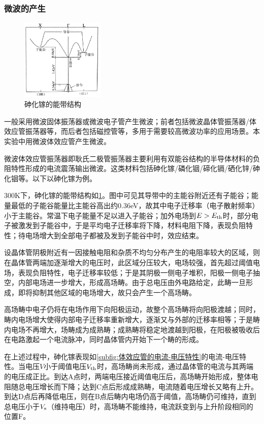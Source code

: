 	\subsubsection{微波的产生} %
	\label{ssub:微波的产生}
		\FloatBarrier
		\begin{figure}
			\includegraphics[width=4cm]{./fig/scan/EnergyBandStructureofGaAs.png}\caption{砷化镓的能带结构\label{fig:砷化镓的能带结构}}
		\end{figure}
		\FloatBarrier
		\par 一般采用微波固体振荡器或微波电子管产生微波；前者包括微波晶体管振荡器/体效应管振荡器等，而后者包括磁控管等，多用于需要较高微波功率的应用场景。本实验中用微波体效应管产生微波。
		\par 微波体效应管振荡器即耿氏二极管振荡器主要利用有双能谷结构的半导体材料的负阻特性形成的电流震荡输出微波。这类材料包括砷化镓/磷化铟/碲化镉/硒化锌/砷化铟等。以下以砷化镓为例。
		\par 300K下，砷化镓的能带结构如\cref{fig:砷化镓的能带结构}。图中可见其导带中的主能谷附近还有子能谷；能量最低的子能谷能量比主能谷高出约0.36eV，故其中电子迁移率（电子散射频率）小于主能谷。常温下电子能量不足以进入子能谷；加外电场到$E>E_{\rm th}$时，部分电子被激发到子能谷中，于是平均电子迁移率将下降，材料电阻下降，表现负阻特性；待电场增大到全部电子都被及发到子能谷中时，效应结束。
		\par 设晶体管阴极附近有一因接触电阻和杂质不均匀分布产生的电阻率较大的区域，则在晶体管两端加逐渐增大的电压时，此区域分压较大，电场较强，首先超过阈值电场，表现负阻特性，电子迁移率较低；于是其阴极一侧电子堆积，阳极一侧电子抽空，内部电场进一步增大，形成高场畴。由于总电压由外电路给定，此畴一旦形成，即将抑制其他区域的电场增大，故只会产生一个高场畴。
		\par 高场畴中电子仍将在电场作用下向阳极运动，故整个高场畴将向阳极渡越；同时，畴内电场增大使得内部电子迁移率重新增大，逐渐又与外部的迁移率相等；于是畴内电场不再增大，场畴成为成熟畴；成熟畴将稳定地渡越到阳极，在阳极被吸收后在电路激起一个电流脉冲，同时晶体管内开始下一个畴的形成。
		\par 在上述过程中，砷化镓表现如\cref{subfig:体效应管的电流-电压特性}的电流-电压特性。当电压$V$小于阈值电压$V_{\rm th}$时，高场畴尚未形成，通过晶体管的电流与其两端的电压成正比。到达A点时，两端电压接近阈值电压后，高场畴开始形成，整体电阻随总电压增长而下降；达到C点后形成成熟畴，电流随着电压增长又略有上升。到达D点后再降低电压，则在B点后畴内电场仍高于阈值，高场畴仍可维持，直到总电压小于$V_{\rm s}$（维持电压）时，高场畴不能维持，电流跃变到与上升阶段相同的位置F。
